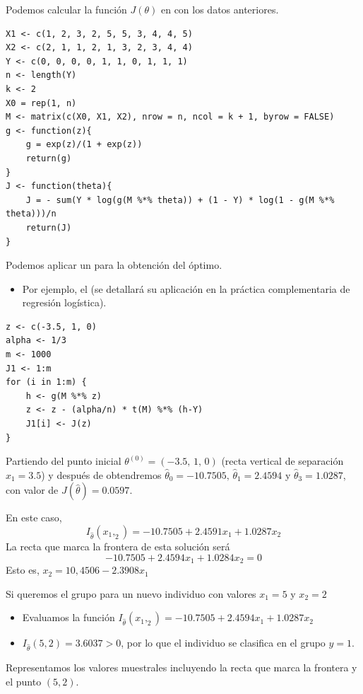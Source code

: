 Podemos calcular la función $J(\theta)$ en  con los datos anteriores.
\pagebreak
\begin{lstlisting}
X1 <- c(1, 2, 3, 2, 5, 5, 3, 4, 4, 5)
X2 <- c(2, 1, 1, 2, 1, 3, 2, 3, 4, 4)
Y <- c(0, 0, 0, 0, 1, 1, 0, 1, 1, 1)
n <- length(Y)
k <- 2
X0 = rep(1, n)
M <- matrix(c(X0, X1, X2), nrow = n, ncol = k + 1, byrow = FALSE)
g <- function(z){
	g = exp(z)/(1 + exp(z))
	return(g)
}
J <- function(theta){
	J = - sum(Y * log(g(M %*% theta)) + (1 - Y) * log(1 - g(M %*% theta)))/n
	return(J)
}
\end{lstlisting}
Podemos aplicar un  para la obtención del óptimo.
\begin{itemize}
	\item Por ejemplo, el  (se detallará su aplicación en la práctica complementaria de regresión logística).
\end{itemize}
\begin{lstlisting}
z <- c(-3.5, 1, 0)
alpha <- 1/3
m <- 1000
J1 <- 1:m
for (i in 1:m) {
	h <- g(M %*% z)
	z <- z - (alpha/n) * t(M) %*% (h-Y)
	J1[i] <- J(z)
}
\end{lstlisting}
Partiendo del punto inicial $\theta^{(0)}=(-3.5,\,1,\,0)$ (recta vertical de separación $x_1=3.5$) y después de  obtendremos $\hat{\theta}_0=-10.7505,\,\hat{\theta}_1=2.4594$ y $\hat{\theta}_3=1.0287$, con valor de $J(\hat{\theta})=0.0597$.

En este caso,\[ I_{\hat{\theta}}(x_1,_2)=-10.7505+2.4591x_1+1.0287x_2 \]
La recta que marca la frontera de esta solución será\[ -10.7505+2.4594x_1+1.0284x_2=0 \]
Esto es, $x_2=10,4506-2.3908x_1$

Si queremos  el grupo para un nuevo individuo con valores $x_1=5$ y $x_2=2$
\begin{itemize}
	\item Evaluamos la función $I_{\hat{\theta}}(x_1,_2)=-10.7505+2.4594x_1+1.0287x_2$
	\item $I_{\hat{\theta}}(5,2)=3.6037>0$, por lo que el individuo se clasifica en el grupo $y=1$.
\end{itemize}
Representamos los valores muestrales incluyendo la recta que marca la frontera y el punto $(5,2)$.

\pagebreak

